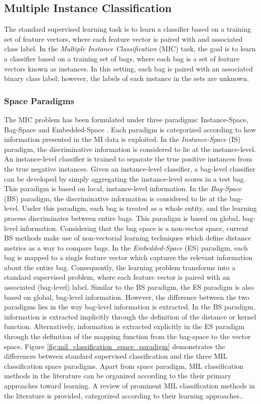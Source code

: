 \subsection{Multiple Instance Classification}
The standard supervised learning task is to learn a classifier based on a training set of feature vectors, where each feature vector is paired with and associated class label.  In the \textit{Multiple Instance Classification} (MIC) task, the goal is to learn a classifier based on a training set of bags, where each bag is a set of feature vectors known as instances.  In this setting, each bag is paired with an associated binary class label; however, the labels of each instance in the sets are unknown. 
\subsubsection{Space Paradigms} The MIC problem has been formulated under three paradigms: Instance-Space, Bag-Space and Embedded-Space \citep{Amores2013MIClassification}.  Each paradigm is categorized according to how information presented in the MI data is exploited.  In the \textit{Instance-Space} (IS) paradigm, the discriminative information is considered to lie at the instance-level.  An instance-level classifier is trained to separate the true positive instances from the true negative instances.  Given an instance-level classifier, a bag-level classifier can be developed by simply aggregating the instance-level scores in a test bag.  This paradigm is based on local, instance-level information.  In the \textit{Bag-Space} (BS) paradigm, the discriminative information is considered to lie at the bag-level.  Under this paradigm, each bag is treated as a whole entity, and the learning process discriminates between entire bags.  This paradigm is based on global, bag-level information.  Considering that the bag space is a non-vector space, current BS methods make use of non-vectorial learning techniques which define distance metrics as a way to compare bags.  In the \textit{Embedded-Space} (ES) paradigm, each bag is mapped to a single feature vector which captures the relevant information about the entire bag.  Consequently, the learning problem transforms into a standard supervised problem, where each feature vector is paired with an associated (bag-level) label.  Similar to the BS paradigm, the ES paradigm is also based on global, bag-level information.  However, the difference between the two paradigms lies in the way bag-level information is extracted.  In the BS paradigm, information is extracted implicitly through the definition of the distance or kernel function.  Alternatively, information is extracted explicitly in the ES paradigm through the definition of the mapping function from the bag-space to the vector space.  Figure \ref{fig:mil_classification_space_paradigm} demonstrates the differences between standard supervised classification and the three MIL classification space paradigms. Apart from space paradigm, MIL classification methods in the literature can be organized according to the their primary approaches toward learning. A review of prominent MIL classification methods in the literature is provided, categorized according to their learning approaches..

